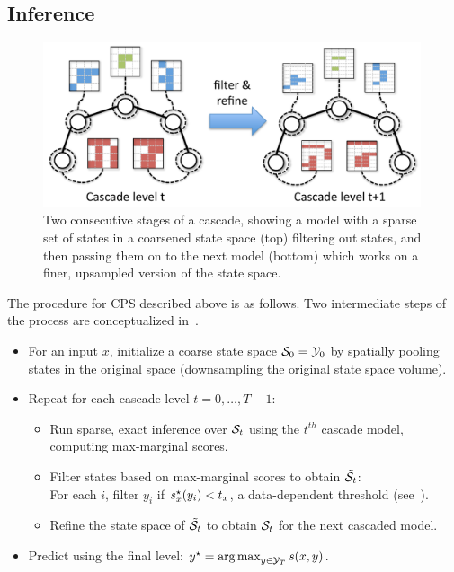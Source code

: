 \subsection{Inference}
\begin{figure}[tb]
\begin{center}
\includegraphics[width=0.99\textwidth]{figs/cascade-concept.pdf}
\caption[Intermediate cascade filtering/refinement step.]{Two consecutive stages of a cascade, showing a model with a sparse set of states in a coarsened state space (top) filtering out states, and then passing them on to the next model (bottom) which works on a finer, upsampled version of the state space.}
\label{fig:cascade-concept}
\end{center}
\end{figure}


The procedure for CPS described above is as follows.  Two intermediate steps of the process are conceptualized in~.

\begin{itemize}
\item For an input $x$, initialize a coarse state space $\mathcal{S}_0 = \mathcal{Y}_0$ by 
spatially pooling states in the original space (downsampling the original state space 
volume).

\item Repeat for each cascade level $t = 0,\ldots,T-1$:
\begin{itemize}
\item Run sparse, exact inference over  $\mathcal{S}_t$ using the $t^{th}$ cascade 
model, computing max-marginal scores.
\item Filter states based on max-marginal scores to obtain $\tilde{\mathcal{S}}_t$:\\
\indent For each $i$, filter $y_i$ if $s^\star_x(y_i) < t_x$, a data-dependent threshold (see~).

 \item Refine the state space of $\tilde{\mathcal{S}}_t$ to obtain $\mathcal{S}_t$ for 
the next cascaded model.
\end{itemize}
\item Predict using the final level: $y^\star = \mathop{\arg\max}_{y \in \mathcal{Y}_T} s(x,y)$.
\end{itemize}


